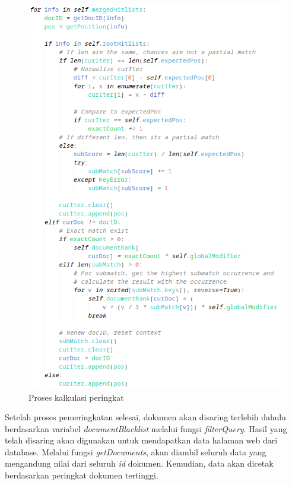 \begin{figure}[H]
  \centering{}
	\includegraphics[width=\textwidth]{gambar/implementasi_calculaterank}
  \caption{Proses kalkulasi peringkat}
\end{figure}

Setelah proses pemeringkatan selesai, dokumen akan disaring terlebih dahulu 
berdasarkan variabel \textit{documentBlacklist} melalui fungsi
\textit{filterQuery}. Hasil yang telah disaring akan digunakan untuk mendapatkan
data halaman web dari database. Melalui fungsi \textit{getDocuments}, akan
diambil seluruh data yang mengandung nilai dari seluruh \textit{id} dokumen.
Kemudian, data akan dicetak berdasarkan peringkat dokumen tertinggi.

